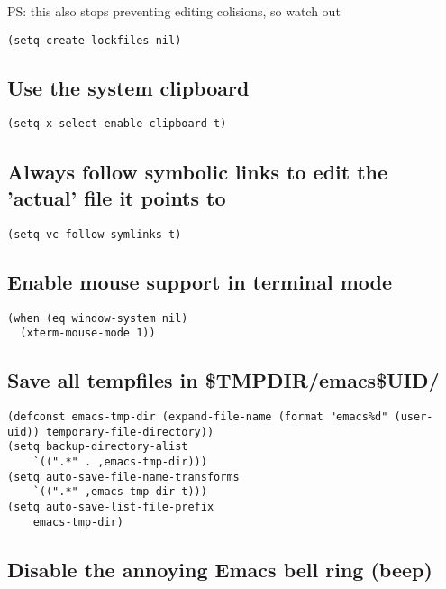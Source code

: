 \documentclass[11pt]{article}
\begin{document}
PS: this also stops preventing editing colisions, so watch out

\begin{verbatim}
(setq create-lockfiles nil)
\end{verbatim}

\subsection*{Use the system clipboard}
\label{sec:org3457311}
\begin{verbatim}
(setq x-select-enable-clipboard t)
\end{verbatim}

\subsection*{Always follow symbolic links to edit the 'actual' file it points to}
\label{sec:org42c347a}

\begin{verbatim}
(setq vc-follow-symlinks t)
\end{verbatim}

\subsection*{Enable mouse support in terminal mode}
\label{sec:org4c04811}

\begin{verbatim}
(when (eq window-system nil)
  (xterm-mouse-mode 1))
\end{verbatim}

\subsection*{Save all tempfiles in \$TMPDIR/emacs\$UID/}
\label{sec:orgaa10a00}

\begin{verbatim}
(defconst emacs-tmp-dir (expand-file-name (format "emacs%d" (user-uid)) temporary-file-directory))
(setq backup-directory-alist
    `((".*" . ,emacs-tmp-dir)))
(setq auto-save-file-name-transforms
    `((".*" ,emacs-tmp-dir t)))
(setq auto-save-list-file-prefix
    emacs-tmp-dir)
\end{verbatim}

\subsection*{Disable the annoying Emacs bell ring (beep)}
\label{sec:orgbf1fef5}
\end{document}
